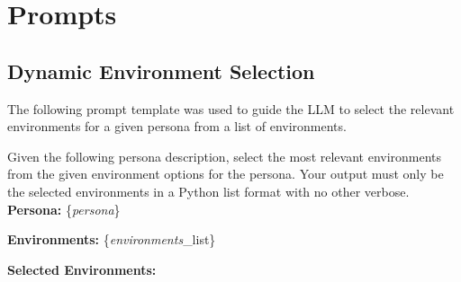 \documentclass[11pt]{article}
\begin{document}
%


\appendix




\section{Prompts}
\subsection{Dynamic Environment Selection}
\label{appendix:env}
The following prompt template was used to guide the LLM to select the relevant environments for a given persona from a list of environments.



\noindent
{\small
\begin{minipage}[t]{\linewidth}
    \begin{tcolorbox}[colback=white!95!gray,colframe=gray!50!black,rounded corners,label={box:environment-selection}, title={Environment Selection Prompt.}]
Given the following persona description, select the most relevant environments from the given environment options for the persona. Your output must only be the selected environments in a Python list format with no other verbose. \\

\textbf{Persona:} \{\textit{persona}\}

\textbf{Environments:} \{\textit{environments}\_list\}

\textbf{Selected Environments:}
    \end{tcolorbox}
\end{minipage}}
\end{document}
